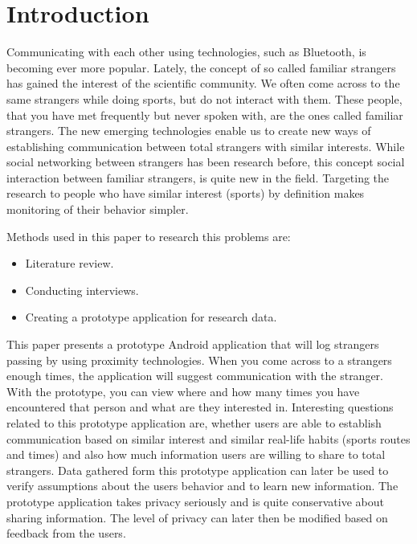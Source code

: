 
\section{Introduction}

Communicating with each other using technologies, such as Bluetooth, is becoming ever more popular. Lately, the concept of so called familiar strangers has gained the interest of the scientific community. We often come across to the same strangers while doing sports, but do not interact with them. These people, that you have met frequently but never spoken with, are the ones called familiar strangers. The new emerging technologies enable us to create new ways of establishing communication between total strangers with similar interests. While social networking between strangers has been research before, this concept social interaction between familiar strangers, is quite new in the field. Targeting the research to people who have similar interest (sports) by definition makes monitoring of their behavior simpler.

Methods used in this paper to research this problems are:
\begin{itemize}
\item  Literature review.
\item Conducting interviews.
\item Creating a prototype application for research data.
\end{itemize}

This paper presents a prototype Android application that will log strangers passing by using proximity technologies. When you come across to a strangers enough times, the application will suggest communication with the stranger. With the prototype, you can view where and how many times you have encountered that person and what are they interested in. Interesting questions related to this prototype application are, whether users are able to establish communication based on similar interest and similar real-life habits (sports routes and times) and also how much information users are willing to share to total strangers. Data gathered form this prototype application can later be used to verify assumptions about the users behavior and to learn new information. The prototype application takes privacy seriously and is quite conservative about sharing information. The level of privacy can later then be modified based on feedback from the users.

